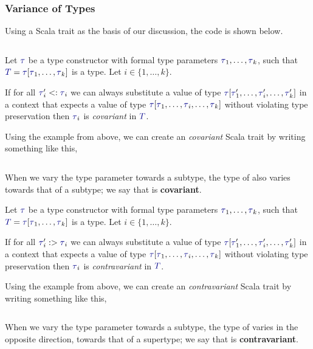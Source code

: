 \subsubsection{Variance of Types}\label{subsubsec:Type_Variance}
Using a \texttt{} Scala trait as the basis of our discussion, the code is shown below.
\inputminted[frame=lines,linenos]{scala}{./EDAP05-Concepts_Programming_Languages-Sections/Advanced_Data_Types/Code/Box.scala}

\begin{definition}[Covariance]\label{def:Type_Covariance}
  Let $\DataType$ be a type constructor with formal type parameters $\DataType_{1}, \ldots , \DataType_{k}$, such that $\SemanticType{T} = \DataType [\DataType_{1}, \ldots, \DataType_{k}]$ is a type.
  Let $i \in \lbrace 1,\ldots, k \rbrace$.

  If for all $\DataType_{i}' <: \DataType_{i}$ we can always substitute a value of type $\DataType [\DataType_{1}',\ldots, \DataType_{i}', \ldots, \DataType_{k}']$ in a context that expects a value of type $\DataType [\DataType_{1}, \ldots, \DataType_{i}, \ldots, \DataType_{k}]$ without violating type preservation then $\DataType_{i}$ is \emph{covariant} in $\SemanticType{T}$.

  Using the  example from above, we can create an \emph{covariant} Scala trait by writing something like this,
  \inputminted[frame=lines,linenos]{scala}{./EDAP05-Concepts_Programming_Languages-Sections/Advanced_Data_Types/Code/CovariantBox.scala}
  When we vary the type parameter  towards a subtype, the type of  also varies towards that of a subtype; we say that  is \textbf{covariant}.
\end{definition}

\begin{definition}[Contravariance]\label{def:Type_Contravariance}
  Let $\DataType$ be a type constructor with formal type parameters $\DataType_{1}, \ldots , \DataType_{k}$, such that $\SemanticType{T} = \DataType [\DataType_{1}, \ldots, \DataType_{k}]$ is a type.
  Let $i \in \lbrace 1,\ldots, k \rbrace$.

  If for all $\DataType_{i}' :> \DataType_{i}$ we can always substitute a value of type $\DataType [\DataType_{1}',\ldots, \DataType_{i}', \ldots, \DataType_{k}']$ in a context that expects a value of type $\DataType [\DataType_{1}, \ldots, \DataType_{i}, \ldots, \DataType_{k}]$ without violating type preservation then $\DataType_{i}$ is \emph{contravariant} in $\SemanticType{T}$.

  Using the  example from above, we can create an \emph{contravariant} Scala trait by writing something like this,
  \inputminted[frame=lines,linenos]{scala}{./EDAP05-Concepts_Programming_Languages-Sections/Advanced_Data_Types/Code/ContravariantBox.scala}
  When we vary the type parameter  towards a subtype, the type of  varies in the opposite direction, towards that of a supertype; we say that  is \textbf{contravariant}.
\end{definition}

